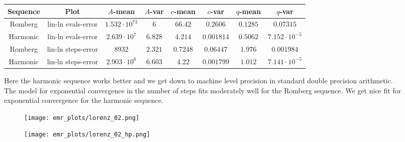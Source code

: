 \begin{table}[H]
    \centering\small
     \begin{tabular}{c|c||c|c|c|c|c|c}
Sequence & Plot & \(A\)-mean & \(A\)-var & \(c\)-mean & \(c\)-var & \(q\)-mean & \(q\)-var\\\hline
Romberg & lin-ln evals-error & \(1.532\cdot 10^{73}\) & \(6\) & \(66.42\) & \(0.2606\) & \(0.1285\) & \(0.07315\) \\
Harmonic & lin-ln evals-error & \(2.639\cdot 10^7\) & \(6.828\) & \(4.214\) & \(0.001814\) & \(0.5062\) & \(7.152\cdot 10^{-5}\) \\
Romberg & lin-ln steps-error & \(8932\) & \(2.321\) & \(0.7248\) & \(0.06447\) & \(1.976\) & \(0.001984\) \\
Harmonic & lin-ln steps-error & \(2.903\cdot 10^6\) & \(6.603\) & \(4.22\) & \(0.001799\) & \(1.012\) & \(7.141\cdot 10^{-5}\) \\
    \end{tabular}
    \label{tab:my_label}
\end{table}

Here the harmonic sequence works better and we get down to machine level precision in standard double precision arithmetic.\\

The model for exponential convergence in the number of steps fits moderately well for the Romberg sequence. We get nice fit for exponential convergence for the harmonic sequence.

\begin{figure}[H]
\centering
\begin{minipage}{0.45\textwidth}
\centering
\texttt{[image: emr\_plots/lorenz\_02.png]}
\end{minipage}
\begin{minipage}{0.45\textwidth}
\centering
\texttt{[image: emr\_plots/lorenz\_02\_hp.png]}
\end{minipage}
\end{figure}

